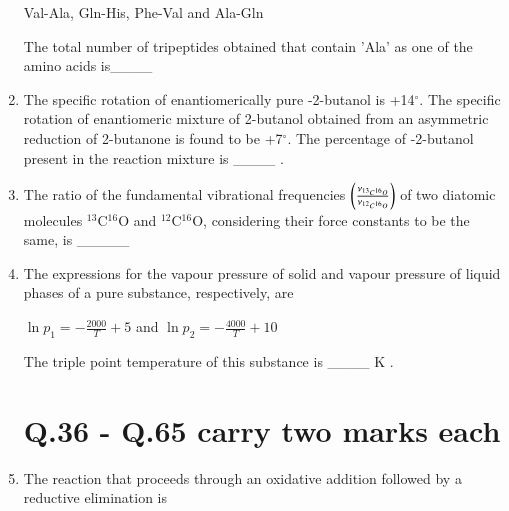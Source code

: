 \documentclass[journal,12pt,onecolumn]{IEEEtran}
\theoremstyle{remark}
\begin{document}
\begin{enumerate}
Val-Ala, Gln-His, Phe-Val and Ala-Gln
 \hfill{}

The total number of tripeptides obtained that contain 'Ala' as one of the amino acids is\_\_\_\_  \hfill{}





\item The specific rotation of enantiomerically pure -2-butanol is +14$^{\circ}$. The specific rotation of enantiomeric mixture of 2-butanol obtained from an asymmetric reduction of 2-butanone is found to be +7$^{\circ}$. The percentage of -2-butanol present in the reaction mixture is \_\_\_\_ . \hfill{}





\item The ratio of the fundamental vibrational frequencies $\left(\frac{\nu_{^{13}C^{16}O}}{\nu_{^{12}C^{16}O}}\right)$ of two diatomic molecules $^{13}$C$^{16}$O and $^{12}$C$^{16}$O, considering their force constants to be the same, is \_\_\_\_\_  \hfill{}




\item The expressions for the vapour pressure of solid  and vapour pressure of liquid  phases of a pure substance, respectively, are

$\ln p_1 = -\frac{2000}{T}+ 5$ and $\ln p_2 = -\frac{4000}{T}+ 10$

The triple point temperature of this substance is \_\_\_\_ K . \hfill{}



\section*{Q.36 - Q.65 carry two marks each}

\item The reaction that proceeds through an oxidative addition followed by a reductive elimination is

    \begin{enumerate}
    

\end{enumerate}
\end{enumerate}
\end{document}
